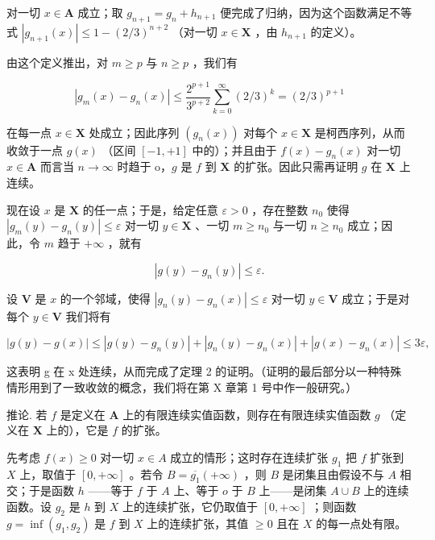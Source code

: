 对一切 \(x \in \mathbf{A}\) 成立；取 \(g_{n+1} = g_n + h_{n+1}\) 便完成了归纳，因为这个函数满足不等式 \(|g_{n+1}(x)| \leqslant 1 - (2/3)^{n+2}\) （对一切 \(x \in \mathbf{X}\) ，由 \(h_{n+1}\) 的定义）。

由这个定义推出，对 \(m \geqslant p\) 与 \(n \geqslant p\) ，我们有

\[
\left| g _ {m} (x) - g _ {n} (x) \right| \leqslant \frac {2 ^ {p + 1}}{3 ^ {p + 2}} \sum_ {k = 0} ^ {\infty} (2 / 3) ^ {k} = (2 / 3) ^ {p + 1}
\]

在每一点 \(x \in \mathbf{X}\) 处成立；因此序列 \((g_n(x))\) 对每个 \(x \in \mathbf{X}\) 是柯西序列，从而收敛于一点 \(g(x)\) （区间 \([-1, +1]\) 中的）；并且由于 \(f(x) - g_n(x)\) 对一切 \(x \in \mathbf{A}\) 而言当 \(n \to \infty\) 时趋于 o，\(g\) 是 \(f\) 到 \(\mathbf{X}\) 的扩张。因此只需再证明 \(g\) 在 \(\mathbf{X}\) 上连续。

现在设 \(x\) 是 \(\mathbf{X}\) 的任一点；于是，给定任意 \(\varepsilon > 0\) ，存在整数 \(n_0\) 使得 \(|g_m(y) - g_n(y)| \leqslant \varepsilon\) 对一切 \(y \in \mathbf{X}\) 、一切 \(m \geqslant n_0\) 与一切 \(n \geqslant n_0\) 成立；因此，令 \(m\) 趋于 \(+\infty\) ，就有

\[
\left| g (y) - g _ {n} (y) \right| \leqslant \varepsilon .
\]

设 \(\mathbf{V}\) 是 \(x\) 的一个邻域，使得 \(|g_n(y) - g_n(x)| \leqslant \varepsilon\) 对一切 \(y \in \mathbf{V}\) 成立；于是对每个 \(y \in \mathbf{V}\) 我们将有

\[
\left| g (y) - g (x) \right| \leqslant \left| g (y) - g _ {n} (y) \right| + \left| g _ {n} (y) - g _ {n} (x) \right| + \left| g (x) - g _ {n} (x) \right| \leqslant 3 \varepsilon ,
\]

这表明 g 在 x 处连续，从而完成了定理 2 的证明。（证明的最后部分以一种特殊情形用到了一致收敛的概念，我们将在第 X 章第 1 号中作一般研究。）

推论. 若 \(f\) 是定义在 \(\mathbf{A}\) 上的有限连续实值函数，则存在有限连续实值函数 \(g\) （定义在 \(\mathbf{X}\) 上的），它是 \(f\) 的扩张。

先考虑 \(f(x) \geqslant 0\) 对一切 \(x \in A\) 成立的情形；这时存在连续扩张 \(g_1\) 把 \(f\) 扩张到 \(X\) 上，取值于 \([0, +\infty]\) 。若令 \(B = \overline{g_1} (+\infty)\) ，则 \(B\) 是闭集且由假设不与 \(A\) 相交；于是函数 \(h\) ——等于 \(f\) 于 \(A\) 上、等于 \(o\) 于 \(B\) 上——是闭集 \(A \cup B\) 上的连续函数。设 \(g_2\) 是 \(h\) 到 \(X\) 上的连续扩张，它仍取值于 \([0, +\infty]\) ；则函数 \(g = \inf(g_1, g_2)\) 是 \(f\) 到 \(X\) 上的连续扩张，其值 \(\geqslant 0\) 且在 \(X\) 的每一点处有限。

